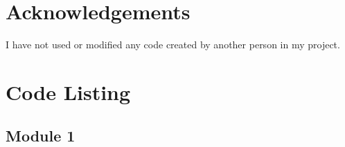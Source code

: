 \section{Acknowledgements}
I have not used or modified any code created by another person in my project.
\section{Code Listing}
\begin{landscape}
\subsection{Module 1}

\end{landscape}
